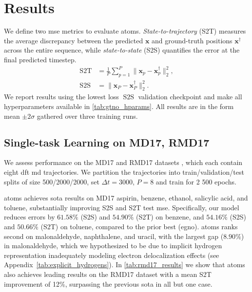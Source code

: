 \section{Results}
We define two \gls{mse} metrics to evaluate \gls{atoms}. \textit{State-to-trajectory} (S2T) measures the average discrepancy between the predicted \(\mathbf{x}\) and ground-truth positions \(\mathbf{x}^\dagger\) across the entire sequence, while \textit{state-to-state} (S2S) quantifies the error at the final predicted timestep.
\begin{align}
    \operatorname{S2T} &= \frac{1}{P}\sum\limits_{p=1}^P\|\mathbf{x}_p - \mathbf{x}^\dagger_p\|_2^2, \\
    \operatorname{S2S} &= \|\mathbf{x}_P - \mathbf{x}^\dagger_P\|_2^2.
\end{align}
We report results using the lowest loss \(\operatorname{S2S}\) validation checkpoint and make all hyperparameters available in \cref{tab:gtno_hparams}. All results are in the form mean \(\pm 2\sigma\) gathered over three training runs.

\subsection{Single-task Learning on MD17, RMD17}
We assess performance on the MD17 and RMD17 datasets \cite{chmiela_machine_2017}, which each contain eight \gls{dft} \gls{md} trajectories. We partition the trajectories into train/validation/test splits of size 500/2000/2000, set \(\Delta t = 3000\), \(P = 8\) and train for 2 500 epochs.

\gls{atoms} achieves \gls{sota} results on MD17 aspirin, benzene, ethanol, salicylic acid, and toluene, substantially improving S2S and S2T test \gls{mse}. Specifically, our model reduces errors by \(61.58\%\) (S2S) and \(54.90\%\) (S2T) on benzene, and \(54.16\%\) (S2S) and \(50.66\%\) (S2T) on toluene, compared to the prior best (\gls{egno}). \gls{atoms} ranks second on malonaldehyde, naphthalene, and uracil, with the largest gap (\(8.90\%\)) in malonaldehyde, which we hypothesized to be due to implicit hydrogen representation inadequately modeling electron delocalization effects (see Appendix~\ref{tab:explicit_hydrogens}). In \cref{tab:rmd17_results} we show that \gls{atoms} also achieves leading results on the RMD17 dataset with a mean S2T improvement of 12\%, surpassing the previous \gls{sota} in all but one case.

